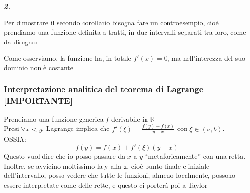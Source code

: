 \documentclass{article}
\theoremstyle{definition}
\newcommand{\R}{\mathbb{R}}
\newcommand{\virgolette}[1]{``#1''}
\begin{document}
\begin{center}
    \textbf{\textit{2.}}
\end{center}
Per dimostrare il secondo corollario bisogna fare un controesempio, cioè prendiamo una funzione definita a tratti, in due intervalli separati tra loro, come da disegno:
\begin{center}
\end{center}
Come osserviamo, la funzione ha, in totale $f'(x)=0$, ma nell'interezza del suo dominio non è costante

\subsubsection{Interpretazione analitica del teorema di Lagrange [IMPORTANTE]}
Prendiamo una funzione generica $f$ derivabile in $\R$
\\
Presi $\forall x<y$, Lagrange implica che $f'(\xi)=\frac{f(y)-f(x)}{y-x}$ con $\xi \in (a,b)$.
\\
OSSIA: \begin{equation}
    f(y)=f(x)+f'(\xi)(y-x)
\end{equation}
Questo vuol dire che io posso passare da $x$ a $y$ \virgolette{metaforicamente} con una retta.
\\
Inoltre, se avvicino moltissimo la y alla x, cioè punto finale e iniziale dell'intervallo, posso vedere che tutte le funzioni, almeno localmente, possono essere interpretate come delle rette, e questo ci porterà poi a Taylor.
\end{document}
